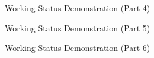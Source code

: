 \documentclass[12pt,a4paper]{article}
\begin{document}
\begin{figure}[!htbp]
    \centering
    \vspace{8cm} %
    \caption{Working Status Demonstration (Part 4)}
\end{figure}

\begin{figure}[!htbp]
    \centering
    \vspace{8cm} %
    \caption{Working Status Demonstration (Part 5)}
\end{figure}

\begin{figure}[!htbp]
    \centering
    \vspace{8cm} %
    \caption{Working Status Demonstration (Part 6)}
\end{figure}
\end{document}
